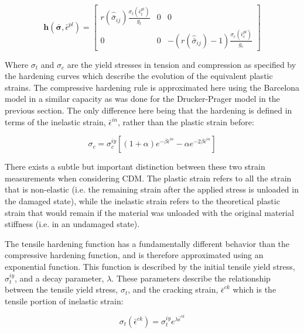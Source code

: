 \begin{equation}
\mathbf{h}\left(\bar{\boldsymbol{\sigma}},\bar{\epsilon}^{pl}\right)=\left[\begin{array}{ccc}
r\left(\hat{\bar{\sigma}}_{ij}\right)\frac{\sigma_t\left(\bar{\epsilon}_{t}^{pl}\right)}{g_t} & 0 & 0\\
0 & 0 & -\left(r\left(\hat{\bar{\sigma}}_{ij}\right)-1\right)\frac{\sigma_c\left(\bar{\epsilon}_{c}^{pl}\right)}{g_c}
\end{array}\right]\label{eqn:const9-1}
\end{equation}

Where $\sigma_t$ and $\sigma_c$ are the yield stresses in tension and compression as specified by the hardening curves which describe the evolution of the equivalent plastic strains. The compressive hardening rule is approximated here using the Barcelona model in a similar capacity as was done for the Drucker-Prager model in the previous section. The only difference here being that the hardening is defined in terms of the inelastic strain, $\bar{\epsilon}^{in}$, rather than the plastic strain before: 

\begin{equation}
\sigma_c=\sigma_c^{iy}\left [ \left ( 1+\alpha \right ) e^{-\beta\bar{\epsilon}^{in}}-\alpha e^{-2\beta\bar{\epsilon}^{in}}  \right ]
\label{eqn:dam1b}
\end{equation}

There exists a subtle but important distinction between these two strain measurements when considering CDM. The plastic strain refers to all the strain that is non-elastic (i.e. the remaining strain after the applied stress is unloaded in the damaged state), while the inelastic strain refers to the theoretical plastic strain that would remain if the material was unloaded with the original material stiffness (i.e. in an undamaged state).

The tensile hardening function has a fundamentally different behavior than the compressive hardening function, and is therefore approximated using an exponential function. This function is described by the initial tensile yield stress, $\sigma_{t}^{iy}$, and a decay parameter, $\lambda$. These parameters describe the relationship between the tensile yield stress, $\sigma_{t}$, and the cracking strain, $\bar{\epsilon}^{ck}$ which is the tensile portion of inelastic strain:

\begin{equation}
\sigma_{t}\left(\bar{\epsilon}^{ck}\right)=\sigma_{t}^{iy}e^{\lambda\bar{\epsilon}^{ck}}
\label{eqn:dam1a}
\end{equation}


